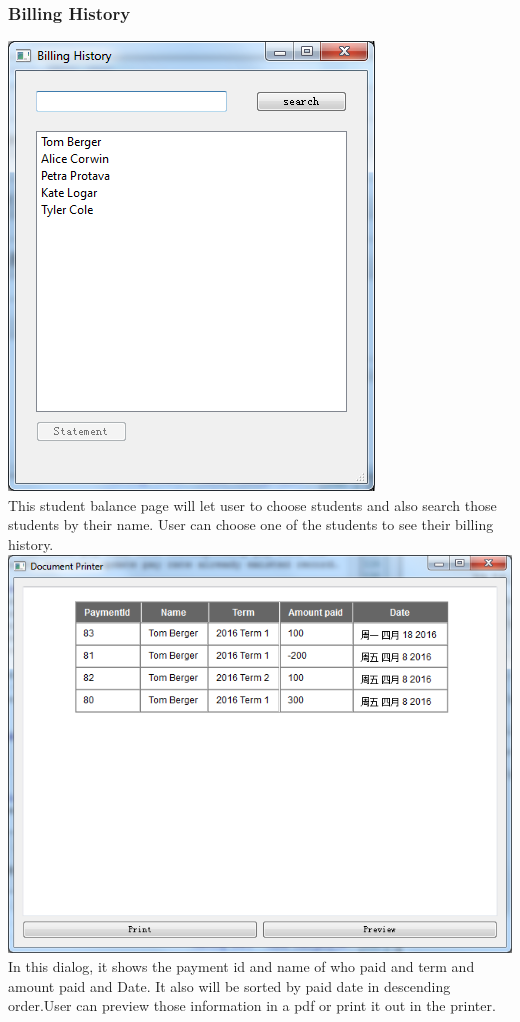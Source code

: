 \subsubsection{Billing History}
\includegraphics[scale=0.5]{pics/billing_main.png}\\
This student balance page will let user to choose students and also search those students by their name. User can choose one of the students to see their billing history.\\
\includegraphics[scale=0.5]{pics/billing_dialog.png}\\
In this dialog, it shows the payment id and name of who paid and term and amount paid and Date. It also will be sorted by paid date in descending order.User can preview those information in a pdf or print it out in the printer.\\

